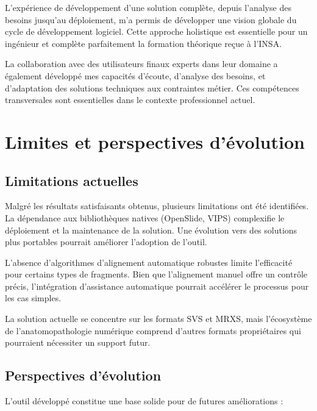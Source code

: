 \documentclass[12pt,a4paper]{report}
\begin{document}
L'expérience de développement d'une solution complète, depuis l'analyse des besoins jusqu'au déploiement, m'a permis de développer une vision globale du cycle de développement logiciel. Cette approche holistique est essentielle pour un ingénieur et complète parfaitement la formation théorique reçue à l'INSA.

La collaboration avec des utilisateurs finaux experts dans leur domaine a également développé mes capacités d'écoute, d'analyse des besoins, et d'adaptation des solutions techniques aux contraintes métier. Ces compétences transversales sont essentielles dans le contexte professionnel actuel.

\section{Limites et perspectives d'évolution}

\subsection{Limitations actuelles}

Malgré les résultats satisfaisants obtenus, plusieurs limitations ont été identifiées. La dépendance aux bibliothèques natives (OpenSlide, VIPS) complexifie le déploiement et la maintenance de la solution. Une évolution vers des solutions plus portables pourrait améliorer l'adoption de l'outil.

L'absence d'algorithmes d'alignement automatique robustes limite l'efficacité pour certains types de fragments. Bien que l'alignement manuel offre un contrôle précis, l'intégration d'assistance automatique pourrait accélérer le processus pour les cas simples.

La solution actuelle se concentre sur les formats SVS et MRXS, mais l'écosystème de l'anatomopathologie numérique comprend d'autres formats propriétaires qui pourraient nécessiter un support futur.

\subsection{Perspectives d'évolution}

\begin{center}
L'outil développé constitue une base solide pour de futures améliorations :
\end{center}

\vspace{0.5em}
\end{document}
